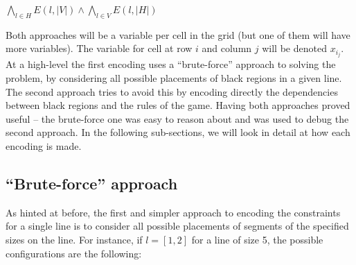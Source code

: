 \documentclass[12pt]{article}
\begin{document}
\begin{center}
  $\bigwedge\limits_{l \in H} E(l, |V|) \wedge \bigwedge\limits_{l \in V} E(l, |H|)$
\end{center}

Both approaches will be a variable per cell in the grid (but one of them will have more variables). The variable for cell at row $i$ and column $j$ will be denoted $x_i_j$.
At a high-level the first encoding uses a ``brute-force'' approach to solving the problem, by considering all possible placements of black regions in a given line.
The second approach tries to avoid this by encoding directly the dependencies between black regions and the rules of the game.
Having both approaches proved useful -- the brute-force one was easy to reason about and was used to debug the second approach.
In the following sub-sections, we will look in detail at how each encoding is made.

\subsection*{``Brute-force'' approach}

As hinted at before, the first and simpler approach to encoding the constraints for a single line is to consider all possible placements of segments of the specified sizes on the line.
For instance, if $l = [1, 2]$ for a line of size 5, the possible configurations are the following:

\begin{center}
\end{center}
\end{document}
